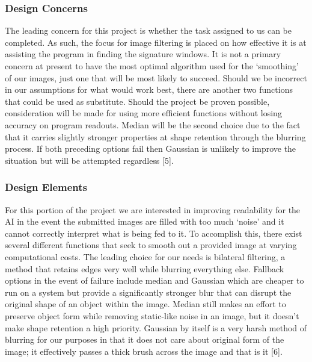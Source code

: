 \documentclass[onecolumn, draftclsnofoot,10pt, compsoc]{IEEEtran}
\begin{document}
\subsubsection{Design Concerns}
The leading concern for this project is whether the task assigned to us can be completed. As such, the focus for image filtering is placed on how effective it is at assisting the program in finding the signature windows. It is not a primary concern at present to have the most optimal algorithm used for the ‘smoothing’ of our images, just one that will be most likely to succeed. Should we be incorrect in our assumptions for what would work best, there are another two functions that could be used as substitute. Should the project be proven possible, consideration will be made for using more efficient functions without losing accuracy on program readouts. Median will be the second choice due to the fact that it carries slightly stronger properties at shape retention through the blurring process. If both preceding options fail then Gaussian is unlikely to improve the situation but will be attempted regardless [5].

\subsubsection{Design Elements}
For this portion of the project we are interested in improving readability for the AI in the event the submitted images are filled with too much ‘noise’ and it cannot correctly interpret what is being fed to it. To accomplish this, there exist several different functions that seek to smooth out a provided image at varying computational costs. The leading choice for our needs is bilateral filtering, a method that retains edges very well while blurring everything else. Fallback options in the event of failure include median and Gaussian which are cheaper to run on a system but provide a significantly stronger blur that can disrupt the original shape of an object within the image. Median still makes an effort to preserve object form while removing static-like noise in an image, but it doesn’t make shape retention a high priority. Gaussian by itself is a very harsh method of blurring for our purposes in that it does not care about original form of the image; it effectively passes a thick brush across the image and that is it [6].
\end{document}
